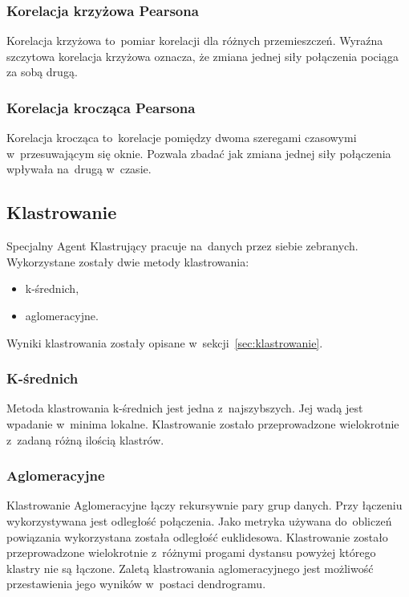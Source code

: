 \documentclass[11pt]{report}
\begin{document}
    \subsubsection{Korelacja krzyżowa Pearsona}
    Korelacja krzyżowa to~pomiar korelacji dla różnych przemieszczeń.
    Wyraźna szczytowa korelacja krzyżowa oznacza, że zmiana jednej siły połączenia pociąga za sobą drugą.

    \subsubsection{Korelacja krocząca Pearsona}
    Korelacja krocząca to~korelacje pomiędzy dwoma szeregami czasowymi w~przesuwającym się oknie.
    Pozwala zbadać jak zmiana jednej siły połączenia wpływała na~drugą w~czasie.

    \subsection{Klastrowanie}

    Specjalny Agent Klastrujący pracuje na~danych przez siebie zebranych.
    Wykorzystane zostały dwie metody klastrowania:
    \begin{itemize}
        \item k-średnich,
        \item aglomeracyjne.
    \end{itemize}

    Wyniki klastrowania zostały opisane w~sekcji~\ref{sec:klastrowanie}.

    \subsubsection{K-średnich}
    Metoda klastrowania k-średnich jest jedna z~najszybszych.
    Jej wadą jest wpadanie w~minima lokalne.
    Klastrowanie zostało przeprowadzone wielokrotnie z~zadaną różną ilością klastrów.


    \subsubsection{Aglomeracyjne}
    Klastrowanie Aglomeracyjne łączy rekursywnie pary grup danych.
    Przy łączeniu wykorzystywana jest odległość połączenia.
    Jako metryka używana do~obliczeń powiązania wykorzystana została odległość euklidesowa.
    Klastrowanie zostało przeprowadzone wielokrotnie z~różnymi progami dystansu powyżej którego klastry nie są łączone.
    Zaletą klastrowania aglomeracyjnego jest możliwość przestawienia jego wyników w~postaci dendrogramu.
\end{document}

